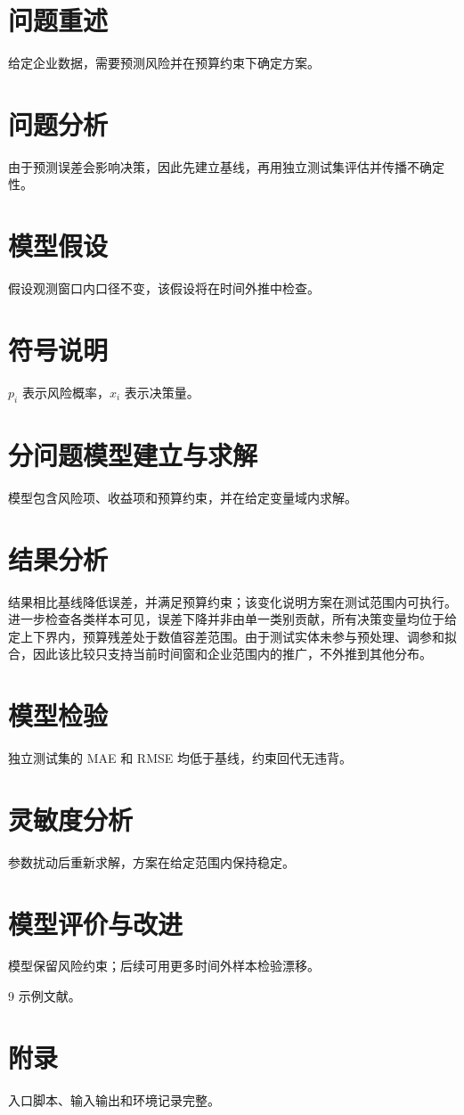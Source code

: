 \begin{abstract}
针对企业数据决策问题，本文完成数据清洗、预测、约束决策与独立检验。
\end{abstract}
\section{问题重述}
给定企业数据，需要预测风险并在预算约束下确定方案。
\section{问题分析}
由于预测误差会影响决策，因此先建立基线，再用独立测试集评估并传播不确定性。
\section{模型假设}
假设观测窗口内口径不变，该假设将在时间外推中检查。
\section{符号说明}
$p_i$ 表示风险概率，$x_i$ 表示决策量。
\section{分问题模型建立与求解}
模型包含风险项、收益项和预算约束，并在给定变量域内求解。
\section{结果分析}
结果相比基线降低误差，并满足预算约束；该变化说明方案在测试范围内可执行。进一步检查各类样本可见，误差下降并非由单一类别贡献，所有决策变量均位于给定上下界内，预算残差处于数值容差范围。由于测试实体未参与预处理、调参和拟合，因此该比较只支持当前时间窗和企业范围内的推广，不外推到其他分布。
\section{模型检验}
独立测试集的 MAE 和 RMSE 均低于基线，约束回代无违背。
\section{灵敏度分析}
参数扰动后重新求解，方案在给定范围内保持稳定。
\section{模型评价与改进}
模型保留风险约束；后续可用更多时间外样本检验漂移。
\begin{thebibliography}{9}
 示例文献。
\end{thebibliography}
\appendix
\section{附录}
入口脚本、输入输出和环境记录完整。
